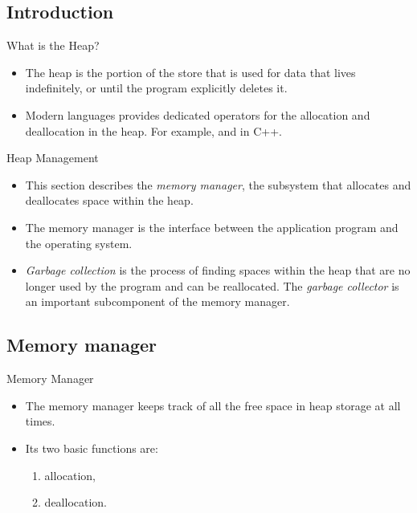 \begin{bibunit}[apalike]
\subsection{Introduction}

\begin{frame}{What is the Heap?}
	\begin{itemize}
	\item The heap is the portion of the store that is used for data that lives indefinitely, or until the program explicitly deletes it.
	\vfill
	\item Modern languages provides dedicated operators for the allocation and deallocation in the heap. For example,  and  in C++.
	\end{itemize}
\end{frame}

\begin{frame}{Heap Management}
	\begin{itemize}
	\item This section describes the \emph{memory manager}, the subsystem that allocates and deallocates space within the heap.
	\vfill
	\item The memory manager is the interface between the application program and the operating system.
	\vfill
	\item \emph{Garbage collection} is the process of finding spaces within the heap that are no longer used by the program and can be reallocated. The \emph{garbage collector} is an important subcomponent of the memory manager.
	\end{itemize}
\end{frame}

\subsection{Memory manager}

\tableofcontentslide[sections={1-5},sectionstyle={show/shaded},subsectionstyle={show/shaded/hide},subsubsectionstyle={hide/hide/hide/hide}]

\begin{frame}{Memory Manager}
	\begin{itemize}
	\item The memory manager keeps track of all the free space in heap storage at all times.
	\vfill
	\item Its two basic functions are:
		\begin{enumerate}
		\item allocation,
		\item deallocation.
		\end{enumerate}
	\end{itemize}
\end{frame}


\end{bibunit}
